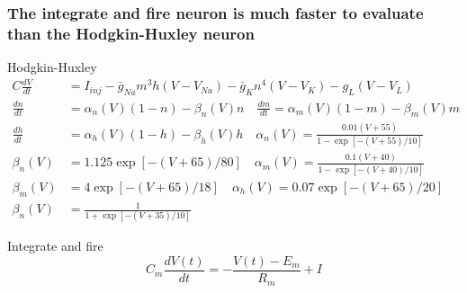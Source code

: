 \documentclass{beamer}
\begin{document}
\begin{frame}
\frametitle{The integrate and fire neuron is much faster to evaluate than the Hodgkin-Huxley neuron}

\begin{block}{Hodgkin-Huxley}
\pause
\tiny
\begin{align*}
 C\frac{dV}{dt} &= I_{inj} - \bar{g}_{Na}m^3h(V-V_{Na}) -\bar{g}_Kn^4(V-V_K) - g_L (V-V_L)\\
 \frac{dn}{dt} &= \alpha_n(V) (1-n) - \beta_n(V)n \quad
 \frac{dm}{dt} = \alpha_m(V) (1-m) - \beta_m(V)m\\
 \frac{dh}{dt} &= \alpha_h(V) (1-h) - \beta_h(V)h \quad
 \alpha_n(V) = \frac{0.01(V+55)}{1-\exp[-(V+55)/10]} \\
 \beta_n(V) &= 1.125\exp[-(V+65)/80] \quad
 \alpha_m(V)  = \frac{0.1(V+40)}{1-\exp[-(V+40)/10]} \\
 \beta_m(V) &= 4\exp[-(V+65)/18] \quad
 \alpha_h(V) = 0.07\exp[-(V+65)/20] \\
 \beta_n(V) &= \frac{1}{1+\exp[-(V+35)/10]}
\end{align*}
\end{block}
\pause
\begin{block}{Integrate and fire}
\pause
\tiny
\begin{equation*}
C_m \frac{dV(t)}{dt} = - \frac{V(t) - E_m}{R_m} + I
\end{equation*}
\end{block}
\end{frame}

\end{document}
